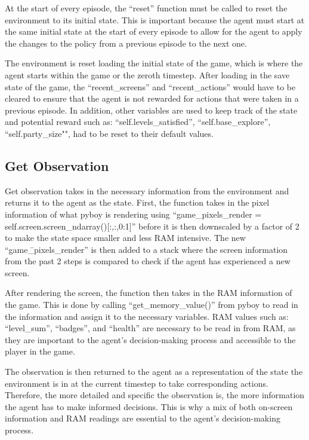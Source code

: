 At the start of every episode, the ``reset'' function must be called to reset the environment to its initial state. This is important because the agent must start at the same initial state at the start of every episode to allow for the agent to apply the changes to the policy from a previous episode to the next one. 

The environment is reset loading the initial state of the game, which is where the agent starts within the game or the zeroth timestep. After loading in the save state of the game, the ``recent\_screens'' and ``recent\_actions'' would have to be cleared to ensure that the agent is not rewarded for actions that were taken in a previous episode. In addition, other variables are used to keep track of the state and potential reward such as: ``self.levels\_satisfied'', ``self.base\_explore'', ``self.party\_size"", had to be reset to their default values. 

\subsection{Get Observation}

Get observation takes in the necessary information from the environment and returns it to the agent as the state. First, the function takes in the pixel information of what pyboy is rendering using ``game\_pixels\_render = self.screen.screen\_ndarray()[:,:,0:1]'' before it is then downscaled by a factor of 2 to make the state space smaller and less RAM intensive. The new ``game\=\_pixels\_render'' is then added to a stack where the screen information from the past 2 steps is compared to check if the agent has experienced a new screen.

After rendering the screen, the function then takes in the RAM information of the game. This is done by calling ``get\_memory\_value()'' from pyboy to read in the information and assign it to the necessary variables. RAM values such as: ``level\_sum'', ``badges'', and ``health'' are necessary to be read in from RAM, as they are important to the agent's decision-making process and accessible to the player in the game. 

The observation is then returned to the agent as a representation of the state the environment is in at the current timestep to take corresponding actions. Therefore, the more detailed and specific the observation is, the more information the agent has to make informed decisions. This is why a mix of both on-screen information and RAM readings are essential to the agent's decision-making process. 

